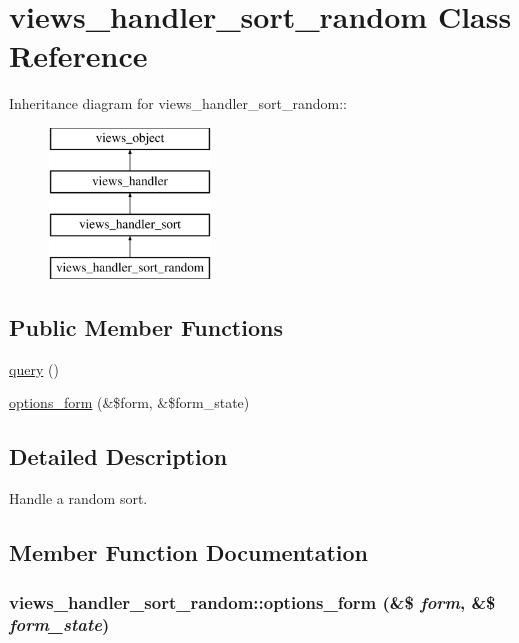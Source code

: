 \hypertarget{classviews__handler__sort__random}{
\section{views\_\-handler\_\-sort\_\-random Class Reference}
\label{classviews__handler__sort__random}
}
Inheritance diagram for views\_\-handler\_\-sort\_\-random::\begin{figure}[H]
\begin{center}
\leavevmode
\includegraphics[height=4cm]{classviews__handler__sort__random}
\end{center}
\end{figure}
\subsection*{Public Member Functions}
\begin{CompactItemize}
\item 
\hyperlink{classviews__handler__sort__random_eaf6fcc03c9d1a0f86a77b9e5314229a}{query} ()
\item 
\hyperlink{classviews__handler__sort__random_51a854154f820622661702ec10532cdb}{options\_\-form} (\&\$form, \&\$form\_\-state)
\end{CompactItemize}


\subsection{Detailed Description}
Handle a random sort. 

\subsection{Member Function Documentation}
\hypertarget{classviews__handler__sort__random_51a854154f820622661702ec10532cdb}{
\subsubsection[{options\_\-form}]{\setlength{\rightskip}{0pt plus 5cm}views\_\-handler\_\-sort\_\-random::options\_\-form (\&\$ {\em form}, \/  \&\$ {\em form\_\-state})}}
\label{classviews__handler__sort__random_51a854154f820622661702ec10532cdb}


